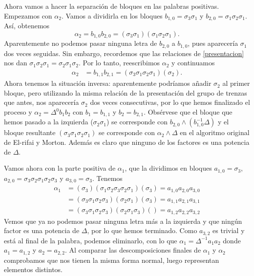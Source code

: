\documentclass[TFG.tex]{subfiles}
\begin{document}
\begin{ej}
Ahora vamos a hacer la separación de bloques en las palabras positivas. Empezamos con $\alpha_2$. Vamos a dividirla en los bloques $b_{1,0}=\sigma_3\sigma_1$ y $b_{2,0}=\sigma_1\sigma_2\sigma_1$. Así, obtenemos
\[
\alpha_2=b_{1,0}b_{2,0}=(\sigma_3\sigma_1)(\sigma_1\sigma_2\sigma_1).
\]
Aparentemente no podemos pasar ninguna letra de $b_{2,0}$ a $b_{1,0}$, pues aparecería $\sigma_1$ dos veces seguidas. Sin embargo, recordemos que las relaciones de \ref{presentacion} nos dan $\sigma_1\sigma_2\sigma_1=\sigma_2\sigma_1\sigma_2$. Por lo tanto, reescribimos $\alpha_2$ y continuamos
\begin{align*}
\alpha_2&=b_{1,1}b_{2,1}=(\sigma_3\sigma_1\sigma_2\sigma_1)(\sigma_2).
\end{align*}
Ahora tenemos la situación inversa: aparentemente podríamos añadir $\sigma_2$ al primer bloque, pero utilizando la misma relación de la presentación del grupo de trenzas que antes, nos aparecería $\sigma_2$ dos veces consecutivas, por lo que hemos finalizado el proceso y $\alpha_2=\Delta^0b_1b_2$ con $b_1=b_{1,1}$ y $b_2=b_{2,1}$. Obsérvese que el bloque que hemos pasado a la izquierda ($\sigma_2\sigma_1$) se corresponde con $b_{2,0}\land (b_{1,0}^{-1}\Delta)$ y el bloque resultante $(\sigma_3\sigma_1\sigma_2\sigma_1)$ se corresponde con $\alpha_2\land\Delta$ en el algoritmo original de El-rifai y Morton. Además es claro que ninguno de los factores es una potencia de $\Delta$.

Vamos ahora con la parte positiva de $\alpha_1$, que la dividimos en bloques $a_{1,0}=\sigma_3$, $a_{2,0}=\sigma_3\sigma_2\sigma_1\sigma_2\sigma_3$ y $a_{3,0}=\sigma_3$. Tenemos 
\begin{align*}
\alpha_1&=(\sigma_3)(\sigma_1\sigma_2\sigma_3\sigma_2\sigma_1)(\sigma_3)=a_{1,0}a_{2,0}a_{3,0} \\
&=(\sigma_3\sigma_1\sigma_2\sigma_3)(\sigma_2\sigma_1)(\sigma_3)=a_{1,1}a_{2,1}a_{3,1}\\
&=(\sigma_3\sigma_1\sigma_2\sigma_3)(\sigma_2\sigma_1\sigma_3)()= a_{1,2}a_{2,2}a_{3,2}
\end{align*}
Vemos que ya no podemos pasar ninguna letra más a la izquierda y que ningún factor es una potencia de $\Delta$, por lo que hemos terminado. Como $a_{3,2}$ es trivial y está al final de la palabra, podemos eliminarlo, con lo que $\alpha_1=\Delta^{-1}a_1a_2$ donde $a_1=a_{1,2}$ y $a_2=a_{2,2}$. Al comparar las descomposiciones finales de $\alpha_1$ y $\alpha_2$ comprobamos que nos tienen la misma forma normal, luego representan elementos distintos.
\end{ej}
\end{document}
